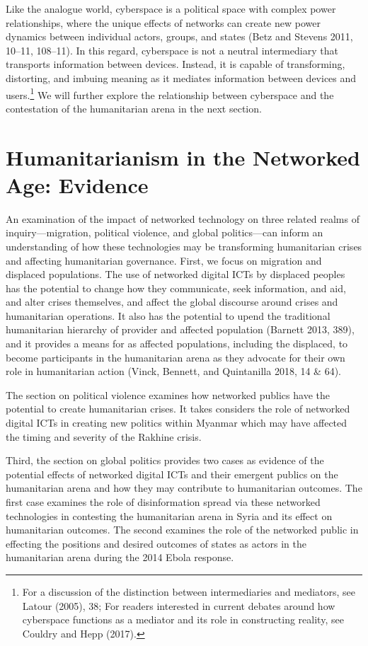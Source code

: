 Like the analogue world, cyberspace is a political space with complex
power relationships, where the unique effects of networks can create new
power dynamics between individual actors, groups, and states (Betz and
Stevens 2011, 10--11, 108--11). In this regard, cyberspace is not a
neutral intermediary that transports information between devices.
Instead, it is capable of transforming, distorting, and imbuing meaning
as it mediates information between devices and users.\footnote{For a
  discussion of the distinction between intermediaries and mediators,
  see Latour (2005), 38; For readers interested in current debates
  around how cyberspace functions as a mediator and its role in
  constructing reality, see Couldry and Hepp (2017).} We will further
explore the relationship between cyberspace and the contestation of the
humanitarian arena in the next section.

\hypertarget{humanitarianism-in-the-networked-age-evidence}{%
\section{Humanitarianism in the Networked Age:
Evidence}\label{humanitarianism-in-the-networked-age-evidence}}

An examination of the impact of networked technology on three related
realms of inquiry---migration, political violence, and global
politics---can inform an understanding of how these technologies may be
transforming humanitarian crises and affecting humanitarian governance.
First, we focus on migration and displaced populations. The use of
networked digital ICTs by displaced peoples has the potential to change
how they communicate, seek information, and aid, and alter crises
themselves, and affect the global discourse around crises and
humanitarian operations. It also has the potential to upend the
traditional humanitarian hierarchy of provider and affected population
(Barnett 2013, 389), and it provides a means for as affected
populations, including the displaced, to become participants in the
humanitarian arena as they advocate for their own role in humanitarian
action (Vinck, Bennett, and Quintanilla 2018, 14 \& 64).

The section on political violence examines how networked publics have
the potential to create humanitarian crises. It takes considers the role
of networked digital ICTs in creating new politics within Myanmar which
may have affected the timing and severity of the Rakhine crisis.

Third, the section on global politics provides two cases as evidence of
the potential effects of networked digital ICTs and their emergent
publics on the humanitarian arena and how they may contribute to
humanitarian outcomes. The first case examines the role of
disinformation spread via these networked technologies in contesting the
humanitarian arena in Syria and its effect on humanitarian outcomes. The
second examines the role of the networked public in effecting the
positions and desired outcomes of states as actors in the humanitarian
arena during the 2014 Ebola response.

